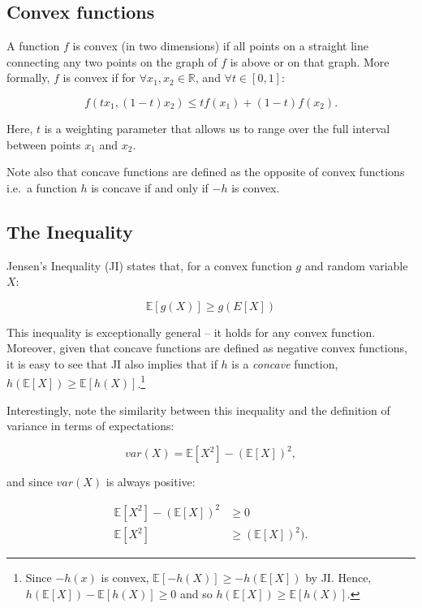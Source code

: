 \documentclass[
]{book}
\begin{document}
\hypertarget{convex-functions}{%
\subsection{Convex functions}\label{convex-functions}}

A function \(f\) is convex (in two dimensions) if all points on a straight line connecting any two points on the graph of \(f\) is above or on that graph. More formally, \(f\) is convex if for \(\forall x_1, x_2 \in \mathbb{R}\), and \(\forall t \in [0,1]\):

\[
    f(tx_1, (1-t)x_2) \leq tf(x_1) + (1-t)f(x_2).
\]

Here, \(t\) is a weighting parameter that allows us to range over the full interval between points \(x_1\) and \(x_2\).

Note also that concave functions are defined as the opposite of convex functions i.e.~a function \(h\) is concave if and only if \(-h\) is convex.

\hypertarget{the-inequality}{%
\subsection{The Inequality}\label{the-inequality}}

Jensen's Inequality (JI) states that, for a convex function \(g\) and random variable \(X\):

\[
    \mathbb{E}[g(X)] \geq g(E[X])
\]

This inequality is exceptionally general -- it holds for any convex function. Moreover, given that concave functions are defined as negative convex functions, it is easy to see that JI also implies that if \(h\) is a \textit{concave} function, \(h(\mathbb{E}[X]) \geq \mathbb{E}[h(X)]\).\footnote{Since \(-h(x)\) is convex, \(\mathbb{E}[-h(X)] \geq -h(\mathbb{E}[X])\) by JI. Hence, \(h(\mathbb{E}[X]) - \mathbb{E}[h(X)] \geq 0\) and so \(h(\mathbb{E}[X]) \geq \mathbb{E}[h(X)]\).}

Interestingly, note the similarity between this inequality and the definition of variance in terms of expectations:

\[
    var(X) = \mathbb{E}[X^2] - (\mathbb{E}[X])^2,
\]

and since \(var(X)\) is always positive:

\[
\begin{aligned}
    \mathbb{E}[X^2] -  (\mathbb{E}[X])^2 &\geq 0 \\
    \mathbb{E}[X^2] &\geq (\mathbb{E}[X])^2).
\end{aligned}
\]
\end{document}
